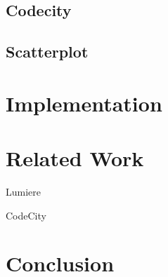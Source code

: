 \documentclass[runningheads]{llncs}
\newcommand{\seclabel}[1]{\label{sec:#1}}
\begin{document}
\subsection{Codecity}

\subsection{Scatterplot}


\section{Implementation} \seclabel{implementation}

\section{Related Work} \seclabel{relatedwork}

Lumiere~\cite{Oliv09a}

CodeCity~\cite{Wett08d}

\section{Conclusion} \seclabel{conclusion}



%



\end{document}
